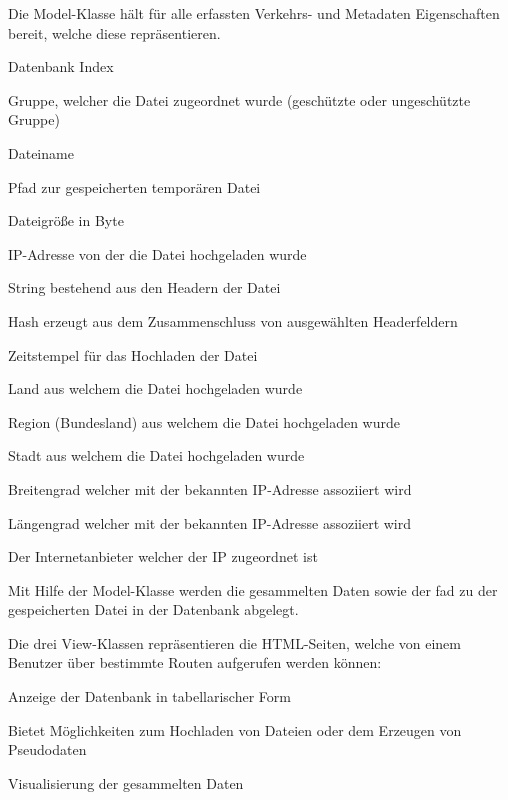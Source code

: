 \documentclass[
    fontsize=12pt,
    headings=small,
    parskip=half,           %
    bibliography=totoc,
    numbers=noenddot,       %
    open=any,               %
    ]{scrreprt}
\begin{document}
Die Model-Klasse hält für alle erfassten Verkehrs- und Metadaten Eigenschaften bereit, welche diese repräsentieren.

\begin{description}[style=nextline]
\item[ID] Datenbank Index
\item[Set] Gruppe, welcher die Datei zugeordnet wurde (geschützte oder ungeschützte Gruppe)
\item[Filename] Dateiname
\item[Filepath] Pfad zur gespeicherten temporären Datei
\item[Size] Dateigröße in Byte
\item[IPAddress]  IP-Adresse von der die Datei hochgeladen wurde
\item[Headers] String bestehend aus den Headern der Datei
\item[HeaderFingerprint] Hash erzeugt aus dem Zusammenschluss von ausgewählten Headerfeldern
\item[DateTime] Zeitstempel für das Hochladen der Datei
\item[Country] Land aus welchem die Datei hochgeladen wurde
\item[RegionName] Region (Bundesland) aus welchem die Datei hochgeladen wurde
\item[City] Stadt aus welchem die Datei hochgeladen wurde
\item[Lat] Breitengrad welcher mit der bekannten IP-Adresse assoziiert wird
\item[Lon] Längengrad welcher mit der bekannten IP-Adresse assoziiert wird
\item[ISP] Der Internetanbieter welcher der IP zugeordnet ist
\end{description}

Mit Hilfe der Model-Klasse werden die gesammelten Daten sowie der fad zu der gespeicherten Datei in der Datenbank abgelegt.

Die drei View-Klassen repräsentieren die HTML-Seiten, welche von einem Benutzer über bestimmte Routen aufgerufen werden können:
\begin{description}[style=nextline] 
\item[/FileEntry] Anzeige der Datenbank in tabellarischer Form
\item[/FileEntryCreate] Bietet Möglichkeiten zum Hochladen von Dateien oder dem Erzeugen von Pseudodaten
\item[/FileEntryVisual] Visualisierung der gesammelten Daten
\end{description}
\end{document}
